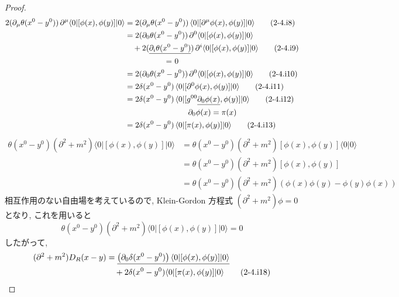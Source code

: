 \documentclass[a4paper,12pt]{article}
\begin{document}
\begin{proof}
\begin{align*}
  2(\partial_\mu \theta(x^0 - y^0))\, \partial^\mu \langle 0 | [\phi(x), \phi(y)] | 0 \rangle &= 2(\partial_\mu \theta(x^0 - y^0))\, \langle 0 | [\partial^\mu \phi(x), \phi(y)] | 0 \rangle \tag{2-4.i8}\\
  &= 2(\partial_0 \theta(x^0 - y^0))\, \partial^0 \langle 0 | [\phi(x), \phi(y)] | 0 \rangle\\
  &\quad + 2(\underline{\partial_i \theta(x^0 - y^0)})\, \partial^i \langle 0 | [\phi(x), \phi(y)] | 0 \rangle \tag{2-4.i9}\\
  &\quad \hspace{1.5cm} \text{= 0}\\
  &= 2(\partial_0 \theta(x^0 - y^0))\, \partial^0 \langle 0 | [\phi(x), \phi(y)] | 0 \rangle \tag{2-4.i10}\\
  &= 2\delta(x^0 - y^0)\, \langle 0 | [\partial^0 \phi(x), \phi(y)] | 0 \rangle \tag{2-4.i11}\\
  &= 2\delta(x^0 - y^0)\, \langle 0 | [g^{00}\underline{\partial_0 \phi(x)}, \phi(y)] | 0 \rangle \tag{2-4.i12}\\
  &\quad \hspace{2.5cm} \partial_0 \phi(x) = \pi(x)\\
  &= 2\delta(x^0 - y^0)\, \langle 0 | [ \pi(x), \phi(y)] | 0 \rangle \tag{2-4.i13}\\
\end{align*}
\begin{align*}
  \theta(x^0 - y^0) \left( \partial^2 + m^2 \right) \langle 0 | [\phi(x), \phi(y)] | 0 \rangle &= \theta(x^0 - y^0) \left( \partial^2 + m^2 \right) [\phi(x), \phi(y)] \langle 0 | 0 \rangle \tag{2-4.i14}\\
  &= \theta(x^0 - y^0) \left( \partial^2 + m^2 \right) [\phi(x), \phi(y)] \tag{2-4.i15}\\
  &= \theta(x^0 - y^0) \left( \partial^2 + m^2 \right) (\phi(x) \phi(y) - \phi(y) \phi(x)) \tag{2-4.i16}
\end{align*}
相互作用のない自由場を考えているので, Klein-Gordon 方程式 $(\partial^2 + m^2) \phi = 0$ となり, これを用いると
\begin{equation*}
  \theta(x^0 - y^0) \left( \partial^2 + m^2 \right) \langle 0 | [\phi(x), \phi(y)] | 0 \rangle = 0 \tag{2-4.i17}
\end{equation*}
したがって,
\begin{align*}
  (\partial^2 + m^2) D_R(x - y) &= \underline{\left( \partial_0 \delta(x^0 - y^0) \right) \langle 0 | [\phi(x), \phi(y)] | 0 \rangle} \notag \\
  &\quad + 2 \delta(x^0 - y^0) \langle 0 | [\pi(x), \phi(y)] | 0 \rangle \tag{2-4.i18}\\

\end{align*}
\end{proof}
\end{document}
